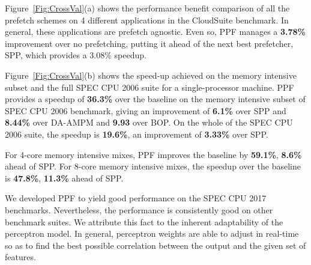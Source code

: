 Figure~\ref{Fig:CrossVal}(a) shows the performance benefit comparison of all
the prefetch schemes on 4 different applications in the CloudSuite benchmark.
In general, these applications are prefetch agnostic. Even so, PPF manages a
\textbf{3.78\%} improvement over no prefetching, putting it ahead of the next
best prefetcher, SPP, which provides a 3.08\% speedup.

Figure~\ref{Fig:CrossVal}(b) shows the speed-up achieved 
on the memory intensive subset and the full SPEC CPU 2006 suite for a
single-processor machine. 
PPF provides a speedup of \textbf{36.3\%} over the baseline on the 
memory intensive subset of SPEC CPU
2006 benchmark, giving an improvement of \textbf{6.1\%} over SPP and
\textbf{8.44\%} over DA-AMPM and \textbf{9.93} over BOP. On the whole of 
the SPEC CPU 2006 suite, the speedup is \textbf{19.6\%}, an improvement 
of \textbf{3.33\%} over SPP.

For 4-core memory intensive mixes, PPF improves the baseline by
\textbf{59.1\%}, \textbf{8.6\%} ahead of SPP. For 8-core memory intensive
mixes, the speedup over the baseline is \textbf{47.8\%}, \textbf{11.3\%} ahead
of SPP.

We developed PPF to yield good performance on the SPEC CPU 2017 benchmarks.
Nevertheless, the performance is consistently good on other benchmark suites.
We attribute this fact to the inherent adaptability of the perceptron model.
In general, perceptron weights are able to adjust in real-time so as to find
the best possible correlation between the output and the given set of
features.

